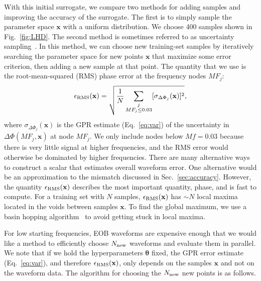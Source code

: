 \documentclass[prd,aps,letter,twocolumn,floatfix,notitlepage,nofootinbib]{revtex4-1}
\def\bx{\mathbf{x}}
\def\by{\mathbf{y}}
\def\btheta{\boldsymbol{\theta}}
\begin{document}
With this initial surrogate, we compare two methods for adding samples and improving the accuracy of the surrogate. The first is to simply sample the parameter space $\bx$ with a uniform distribution. We choose 400 samples shown in Fig.~\ref{fig:LHD}. The second method is sometimes referred to as uncertainty sampling~\cite{BrochuCoraDeFreitas2010}. In this method, we can choose new training-set samples by iteratively searching the parameter space for new points ${\bm x}$ that maximize some error criterion, then adding a new sample at that point. The quantity that we use is the root-mean-squared (RMS) phase error at the frequency nodes $MF_j$:
\begin{equation}
\epsilon_{\rm RMS}(\bx) = \sqrt{\frac{1}{N} \sum_{ \substack{j \\ MF_j \le 0.03} } [\sigma_{\Delta\Phi_j}(\bx)]^2},
\label{eq:errorrms}
\end{equation}
where $\sigma_{\Delta\Phi_j}(\bx)$ is the GPR estimate (Eq.~\eqref{eq:var}) of the uncertainty in $\Delta\Phi(MF_j, \bx)$ at node $MF_j$. We only include nodes below $Mf=0.03$ because there is very little signal at higher frequencies, and the RMS error would otherwise be dominated by higher frequencies. There are many alternative ways to construct a scalar that estimates overall waveform error. One alternative would be an approximation to the mismatch discussed in Sec.~\ref{sec:accuracy}. However, the quantity $\epsilon_{\rm RMS}(\bx)$ describes the most important quantity, phase, and is fast to compute. For a training set with $N$ samples, $\epsilon_{\rm RMS}(\bx)$ has $\sim N$ local maxima located in the voids between samples $\bx$. To find the global maximum, we use a basin hopping algorithm~\cite{WalesDoye1998, scipy:basinhopping} to avoid getting stuck in local maxima.

For low starting frequencies, EOB waveforms are expensive enough that we would like a method to efficiently choose $N_{\rm new}$ waveforms and evaluate them in parallel. We note that if we hold the hyperparameters $\btheta$ fixed, the GPR error estimate (Eq.~\eqref{eq:var}), and therefore $\epsilon_{\rm RMS}(\bx)$, only depends on the samples $\bx$ and not on the waveform data. The algorithm for choosing the $N_{\rm new}$ new points is as follows.


%
%
%
%
\end{document}
